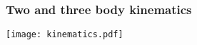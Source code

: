 \begin{frame}
\frametitle{Two and three body kinematics}

\texttt{[image: kinematics.pdf]}
 
\end{frame}
